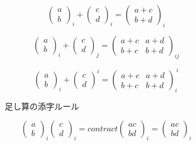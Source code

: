 \begin{figure}
\begin{minipage}[t]{0.5\columnwidth}
\begin{subfigure}[h]{1.0\textwidth}
\begin{center}
\[\begin{pmatrix}
a \\
b
\end{pmatrix}_{i}
+
\begin{pmatrix}
c \\
d
\end{pmatrix}_{i}
=
\begin{pmatrix}
a + c \\
b + d
\end{pmatrix}_{i}\]

\[\begin{pmatrix}
a \\
b
\end{pmatrix}_{i}
+
\begin{pmatrix}
c \\
d
\end{pmatrix}_{j}
=
\begin{pmatrix}
a + c & a + d \\
b + c & b + d
\end{pmatrix}_{ij}\]

\[\begin{pmatrix}
a \\
b
\end{pmatrix}_{i}
+
\begin{pmatrix}
c \\
d
\end{pmatrix}^{i}
=
\begin{pmatrix}
a + c & a + d \\
b + c & b + d
\end{pmatrix}_{i}^{\ i}\]
\end{center}
\caption{足し算の添字ルール}
\label{fig:ruleAdd}
\end{subfigure}
\end{minipage}%
\begin{minipage}[t]{0.5\columnwidth}
\begin{subfigure}[h]{1.0\textwidth}
\begin{center}
\[\begin{pmatrix}
a \\
b
\end{pmatrix}_{i}
\begin{pmatrix}
c \\
d
\end{pmatrix}_{i}
=
contract
\begin{pmatrix}
a c \\
b d
\end{pmatrix}_{i}
=
\begin{pmatrix}
a c \\
b d
\end{pmatrix}_{i}\]


\end{center}
\end{subfigure}
\end{minipage}
\end{figure}
